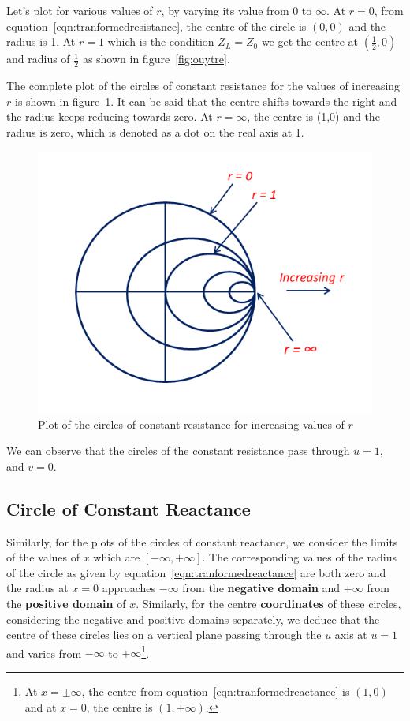 Let's plot for various values of $r$, by varying its value from 0 to $\infty$. At $r = 0$, from equation~\eqref{eqn:tranformedresistance}, the centre of the circle is $(0,0)$ and the radius is 1. At $r = 1$ which is the condition $Z_L = Z_0$ we get the centre at $\left(\frac{1}{2}, 0\right)$ and radius of $\frac{1}{2}$ as shown in figure~\ref{fig:ouytre}.

The complete plot of the circles of constant resistance for the values of increasing $r$ is shown in figure~\ref{fig:rghmgfcx}. It can be said that the centre shifts towards the right and the radius keeps reducing towards zero. At $r = \infty$, the centre is (1,0) and the radius is zero, which is denoted as a dot on the real axis at 1.
\begin{figure}[h]
\centering
\includegraphics[width=0.9\linewidth]{graphics/const_resistance_circles}
\caption{Plot of the circles of constant resistance for increasing values of $r$}
\label{fig:rghmgfcx}
\end{figure}

We can observe that the circles of the constant resistance pass through $u = 1$, and $v = 0$.

\subsection{Circle of Constant Reactance}
Similarly, for the plots of the circles of constant reactance, we consider the limits of the values of $x$ which are $[-\infty, +\infty]$. The corresponding values of the radius of the circle as given by equation~\eqref{eqn:tranformedreactance} are both zero and the radius at $x = 0$ approaches $-\infty$ from the \textbf{negative domain} and $+\infty$ from the \textbf{positive domain} of $x$. Similarly, for the centre \textbf{coordinates} of these circles, considering the negative and positive domains separately, we deduce that the centre of these circles lies on a vertical plane passing through the $u$ axis at $u = 1$ and varies from $-\infty$ to $+\infty$\footnote{
At $x = \pm\infty$, the centre from equation~\eqref{eqn:tranformedreactance} is $(1, 0)$ and at $x = 0$, the centre is $(1, \pm\infty)$.
}.

